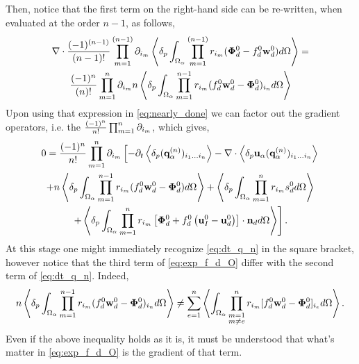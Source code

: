 \documentclass[11pt]{My_preprint}
\providecommand{\DIFaddbegin}{} %
\providecommand{\DIFaddend}{} %
\providecommand{\DIFdelbegin}{} %
\providecommand{\DIFdelend}{} %
\begin{document}
Then, notice that the first term on the right-hand side can be re-written, when evaluated at the order $n-1$, as follows,
\begin{multline*}
    \div \expo[(n-1)]{(\bm\Phi_d^0 - f_d^0 \textbf{w}_d^0)}
    = \\
    \frac{(-1)^{n}}{{(n)}!} \partialp{1}{n}  n \pOavg{ \pri{1}{n-1}(f_d^0 \textbf{w}_d^0 - \bm\Phi_d^0)_{i_{n}} }
\end{multline*} 
Upon using that expression in \ref{eq:nearly_done} we can factor out the gradient operators, i.e. the $\frac{(-1)^n}{n!} \partialp{1}{n}$, which gives, 
\begin{multline}
    0 = \frac{(-1)^n}{n!}
    \partialp{1}{n}
    \left[
        - \partial_t
        \DIFdelbegin %
\DIFdelend \DIFaddbegin \pavg{(\textbf{q}_\alpha^{(n)})_{i_1\ldots i_n}}
        \DIFaddend - \div \DIFdelbegin %
\DIFdelend \DIFaddbegin \pavg{\textbf{u}_\alpha (\textbf{q}_\alpha^{(n)})_{i_1\ldots i_n}}
    \DIFaddend \right.\\\left.
        +n\pavg{\int_{\Omega_\alpha} \pri{1}{n-1} (f_d^0 \textbf{w}_d^0-\bm\Phi_d^0) d\Omega}
        +\pavg{\int_{\Omega_\alpha} \pri{1}{n} s_d^0 d\Omega}
        \right.\\\left.
        +\pavg{\int_{\Omega_\alpha} \pri{1}{n} \left[
            \bm\Phi_d^0
            + f_d^0
            \left(
                \textbf{u}_I^0
                - \textbf{u}_d^0
            \right)
        \right]
        \cdot \textbf{n}_d d\Omega}
    \right].
    \label{eq:exp_f_d_O}
\end{multline}
At this stage one might immediately recognize \ref{eq:dt_q_n} in the square bracket, however notice that the third term of \ref{eq:exp_f_d_O} differ with the second term of \ref{eq:dt_q_n}. 
Indeed, 
\begin{equation*}
    n\pavg{\int_{\Omega_\alpha} \pri{1}{n-1} ( f_d^0 \textbf{w}_d^0-\bm\Phi_d^0)_{i_n} d\Omega}
    \neq
    \sum_{e=1}^{n} 
    \avg{
        \intO{
        \prod^{n}_{\substack{ m=1 \\m \neq e}} r_{i_m} [f_d^0 \textbf{w}_d^0  - \bm\Phi_d^0]_{i_e}
        }
    }. 
    \label{eq:ineq_which_does_not_make_sens}
\end{equation*}
Even if the above inequality holds as it is, it must be understood that what's matter in \ref{eq:exp_f_d_O} is the gradient of that term. 
\end{document}

